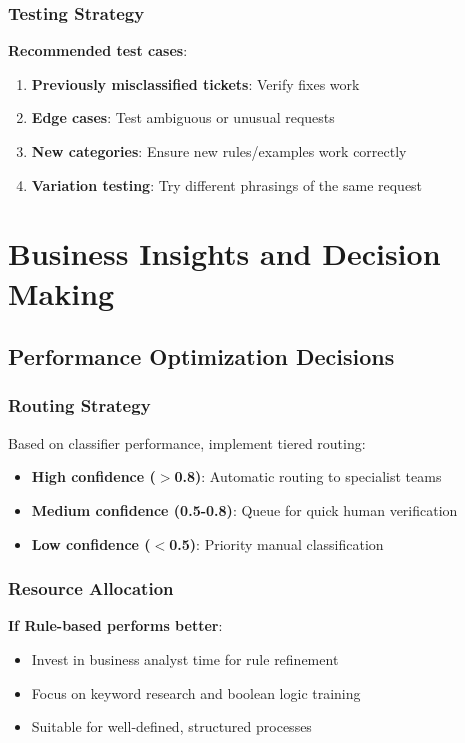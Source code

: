 \documentclass[11pt,a4paper]{article}
\begin{document}
\subsubsection{Testing Strategy}
\textbf{Recommended test cases}:
\begin{enumerate}
    \item \textbf{Previously misclassified tickets}: Verify fixes work
    \item \textbf{Edge cases}: Test ambiguous or unusual requests
    \item \textbf{New categories}: Ensure new rules/examples work correctly
    \item \textbf{Variation testing}: Try different phrasings of the same request
\end{enumerate}

\section{Business Insights and Decision Making}

\subsection{Performance Optimization Decisions}

\subsubsection{Routing Strategy}
Based on classifier performance, implement tiered routing:

\begin{itemize}
    \item \textbf{High confidence ($>$0.8)}: Automatic routing to specialist teams
    \item \textbf{Medium confidence (0.5-0.8)}: Queue for quick human verification
    \item \textbf{Low confidence ($<$0.5)}: Priority manual classification
\end{itemize}

\subsubsection{Resource Allocation}
\textbf{If Rule-based performs better}:
\begin{itemize}
    \item Invest in business analyst time for rule refinement
    \item Focus on keyword research and boolean logic training
    \item Suitable for well-defined, structured processes
\end{itemize}
\end{document}
